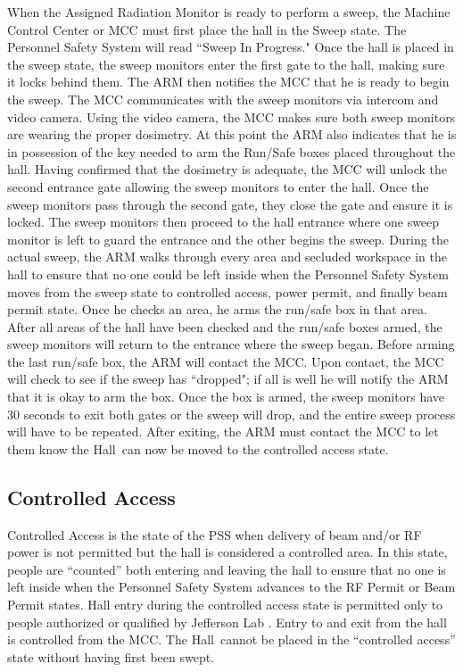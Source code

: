 When the Assigned Radiation Monitor is ready to perform a sweep, the
Machine Control Center or MCC must first place the hall in the Sweep
state. The Personnel Safety System will read ``Sweep In Progress."
Once the hall is placed in the sweep state, the sweep monitors enter
the first gate to the hall, making sure it locks behind them. The ARM
then notifies the MCC that he is ready to begin the sweep. The MCC
communicates with the sweep monitors via intercom and video
camera. Using the video camera, the MCC makes sure both sweep monitors
are wearing the proper dosimetry. At this point the ARM also indicates
that he is in possession of the key needed to arm the Run/Safe boxes
placed throughout the hall.  Having confirmed that the dosimetry is
adequate, the MCC will unlock the second entrance gate allowing the
sweep monitors to enter the hall. Once the sweep monitors pass through
the second gate, they close the gate and ensure it is locked. The
sweep monitors then proceed to the hall entrance where one sweep
monitor is left to guard the entrance and the other begins the sweep.
During the actual sweep, the ARM walks through every area and secluded
workspace in the hall to ensure that no one could be left inside when
the Personnel Safety System moves from the sweep state to controlled
access, power permit, and finally beam permit state. Once he checks an
area, he arms the run/safe box in that area.  After all areas of the
hall have been checked and the run/safe boxes armed, the sweep
monitors will return to the entrance where the sweep began. Before
arming the last run/safe box, the ARM will contact the MCC. Upon
contact, the MCC will check to see if the sweep has ``dropped"; if all
is well he will notify the ARM that it is okay to arm the box. Once
the box is armed, the sweep monitors have 30 seconds to exit both
gates or the sweep will drop, and the entire sweep process will have
to be repeated. After exiting, the ARM must contact the MCC to let
them know the Hall~can now be moved to the controlled access state.
 
\begin{safetyen}{10}{10}
\subsection{Controlled Access}
\end{safetyen}

 Controlled Access is the state of the PSS when delivery of beam
and/or RF power is not permitted but the hall is considered a
controlled area.  In this state, people are ``counted'' both entering
and leaving the hall to ensure that no one is left inside when the
Personnel Safety System advances to the RF Permit or Beam Permit
states.  Hall entry during the controlled access state is permitted
only to people authorized or qualified by Jefferson Lab .  Entry to
and exit from the hall is controlled from the MCC.  The Hall~cannot be
placed in the ``controlled access'' state without having first been
swept.

